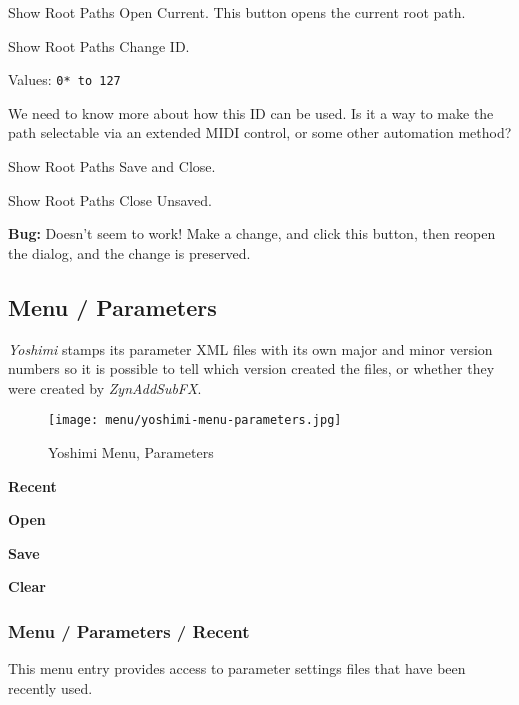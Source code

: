    Show Root Paths Open Current.
   This button opens the current root path.

   Show Root Paths Change ID.

   Values: \texttt{0* to 127}

   We need to know more about how this ID can be used.
   Is it a way to make the path selectable via an extended MIDI control, or
   some other automation method?

   Show Root Paths Save and Close.

   Show Root Paths Close Unsaved.

   \textbf{Bug:}
   Doesn't seem to work!
   Make a change, and click this button, then reopen the dialog, 
   and the change is preserved.

\subsection{Menu / Parameters}
\label{subsec:menu_parameters}

   \textsl{Yoshimi} stamps its parameter XML files with its own major and
   minor version numbers so it is possible to tell which version created the
   files, or whether they were created by \textsl{ZynAddSubFX}.

\begin{figure}[H]
   \centering 
   \texttt{[image: menu/yoshimi-menu-parameters.jpg]}
   \caption{Yoshimi Menu, Parameters}
   \label{fig:yoshimi_menu_parameters}
\end{figure}

   \begin{enumber}
      \item \textbf{Recent}
      \item \textbf{Open}
      \item \textbf{Save}
      \item \textbf{Clear}
   \end{enumber}

\subsubsection{Menu / Parameters / Recent}
\label{subsubsec:menu_parameters_recent}

   This menu entry provides access to parameter settings files that have
   been recently used.


